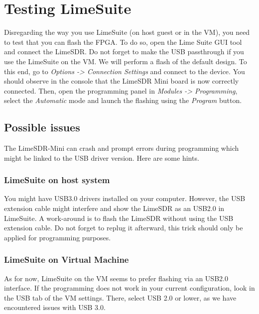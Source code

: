 \section{Testing LimeSuite}

Disregarding the way you use LimeSuite (on host guest or in the VM), you need to test that you can flash the FPGA. To do so, open the Lime Suite GUI tool and connect the LimeSDR. Do not forget to make the USB passthrough if you use the LimeSuite on the VM. We will perform a flash of the default design. To this end, go to \textit{Options -> Connection Settings} and connect to the device. You should observe in the console that the LimeSDR Mini board is now correctly connected. Then, open the programming panel in \textit{Modules -> Programming}, select the \textit{Automatic} mode and launch the flashing using the \textit{Program} button.

\subsection{Possible issues}
The LimeSDR-Mini can crash and prompt errors during programming which might be linked to the USB driver version. Here are some hints.

\subsubsection{LimeSuite on host system}
You might have USB3.0 drivers installed on your computer. However, the USB extension cable might interfere and show the LimeSDR as an USB2.0 in LimeSuite. A work-around is to flash the LimeSDR without using the USB extension cable. Do not forget to replug it afterward, this trick should only be applied for programming purposes.


\subsubsection{LimeSuite on Virtual Machine}
As for now, LimeSuite on the VM seems to prefer flashing via an USB2.0 interface. If the programming does not work in your current configuration, look in the USB tab of the VM settings. There, select USB 2.0 or lower, as we have encountered issues with USB 3.0.
